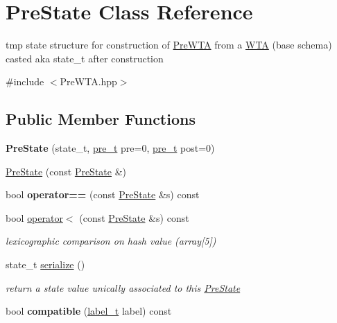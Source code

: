 \hypertarget{classPreState}{}\section{Pre\+State Class Reference}
\label{classPreState}


tmp state structure for construction of \mbox{\hyperlink{classPreWTA}{Pre\+W\+TA}} from a \mbox{\hyperlink{classWTA}{W\+TA}} (base schema) casted aka state\+\_\+t after construction  




{\ttfamily \#include $<$Pre\+W\+T\+A.\+hpp$>$}

\subsection*{Public Member Functions}
\begin{DoxyCompactItemize}
\item 
{\bfseries Pre\+State} (state\+\_\+t, \mbox{\hyperlink{group__general_ga092fe8b972dfa977c2a0886720a7731e}{pre\+\_\+t}} pre=0, \mbox{\hyperlink{group__general_ga092fe8b972dfa977c2a0886720a7731e}{pre\+\_\+t}} post=0)
\item 
\mbox{\hyperlink{group__schemata_gabc0c5bcc094646426f0a90313808907b}{Pre\+State}} (const \mbox{\hyperlink{classPreState}{Pre\+State}} \&)
\item 
bool {\bfseries operator==} (const \mbox{\hyperlink{classPreState}{Pre\+State}} \&s) const
\item 
bool \mbox{\hyperlink{group__schemata_gaa39a99008e7809c864be28f89c5ef79b}{operator$<$}} (const \mbox{\hyperlink{classPreState}{Pre\+State}} \&s) const
\begin{DoxyCompactList}\small\item\em lexicographic comparison on hash value (array\mbox{[}5\mbox{]}) \end{DoxyCompactList}\item 
state\+\_\+t \mbox{\hyperlink{group__schemata_gaa60c0f6f8e237bad468bd8a48c3263f4}{serialize}} ()
\begin{DoxyCompactList}\small\item\em return a state value unically associated to this \mbox{\hyperlink{classPreState}{Pre\+State}} \end{DoxyCompactList}\item 
bool {\bfseries compatible} (\mbox{\hyperlink{group__output_ga22fde970e635fcf63962743b2d5c441d}{label\+\_\+t}} label) const
\end{DoxyCompactItemize}
